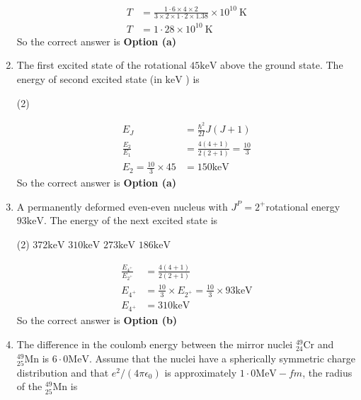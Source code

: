 \begin{enumerate}
\begin{answer}
$$\begin{aligned}
	T &=\frac{1 \cdot 6 \times 4 \times 2}{3 \times 2 \times 1 \cdot 2 \times 1.38} \times 10^{10} \mathrm{~K} \\
	T &=1 \cdot 28 \times 10^{10} \mathrm{~K}
\end{aligned}
$$
So the correct answer is \textbf{Option (a)}
\end{answer}
	\item The first excited state of the rotational $45 \mathrm{keV}$ above the ground state. The energy of second excited state (in $\mathrm{keV}$ ) is
 \begin{tasks}(2)
\end{tasks}
\begin{answer}
	$$
	\begin{aligned}
	E_J&=\frac{\hbar^2}{2 I} J(J+1) \\
	\frac{E_2}{E_1}&=\frac{4(4+1)}{2(2+1)}=\frac{10}{3} \\
	E_2=\frac{10}{3} \times 45&=150 \mathrm{keV}
\end{aligned}
$$
So the correct answer is \textbf{Option (a)}
\end{answer}
	\item A permanently deformed even-even nucleus with $J^P=2^{+}$rotational energy $93 \mathrm{keV}$. The energy of the next excited state is
 \begin{tasks}(2)
	\task[\textbf{a.}] $372 \mathrm{keV}$
	\task[\textbf{b.}]$310 \mathrm{keV}$
	\task[\textbf{c.}] $273 \mathrm{keV}$
	\task[\textbf{d.}] $186 \mathrm{keV}$
\end{tasks}
\begin{answer}
	$$
	\begin{aligned}
	\frac{E_{4^{+}}}{E_{2^{+}}}&=\frac{4(4+1)}{2(2+1)}\\
	E_{4^{+}}&=\frac{10}{3} \times E_{2^{+}}=\frac{10}{3} \times 93 \mathrm{keV} \\
	E_{4^{+}}&=310 \mathrm{keV}
\end{aligned}
$$
So the correct answer is \textbf{Option (b)}
\end{answer}
	\item The difference in the coulomb energy between the mirror nuclei ${ }_{24}^{49} \mathrm{Cr}$ and ${ }_{25}^{49} \mathrm{Mn}$ is $6 \cdot 0 \mathrm{MeV}$. Assume that the nuclei have a spherically symmetric charge distribution and that $e^2 /\left(4 \pi \epsilon_0\right)$ is approximately $1 \cdot 0 \mathrm{MeV}-f m$, the radius of the ${ }_{25}^{49} \mathrm{Mn}$ is

\end{enumerate}
